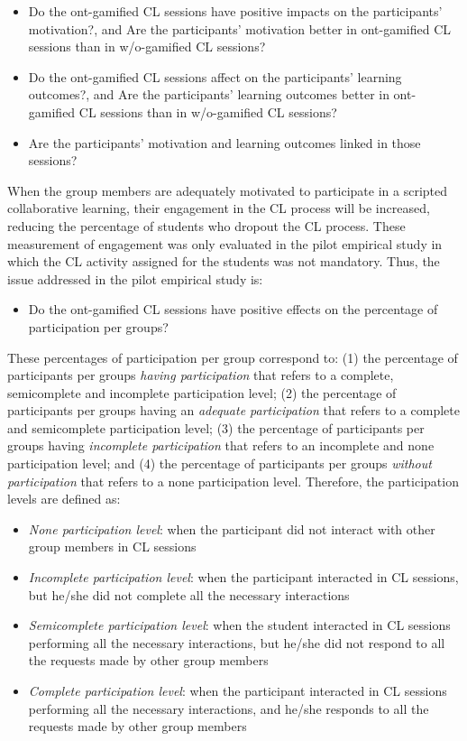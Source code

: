 \begin{itemize}
\item Do the ont-gamified CL sessions have positive impacts on the participants' motivation?, and
Are the participants' motivation better in ont-gamified CL sessions than in w/o-gamified CL sessions?
\item Do the ont-gamified CL sessions affect on the participants' learning outcomes?, and
Are the participants' learning outcomes better in ont-gamified CL sessions than in w/o-gamified CL sessions?
\item Are the participants' motivation and learning outcomes linked in those sessions?
\end{itemize}

When the group members are adequately motivated to participate in a scripted collaborative learning, their engagement in the CL process will be increased, reducing the percentage of students who dropout the CL process.
These measurement of engagement was only evaluated in the pilot empirical study in which the CL activity assigned for the students was not mandatory. 
Thus, the issue addressed in the pilot empirical study is:

\begin{itemize}
\item Do the ont-gamified CL sessions have positive effects on the percentage of participation per groups?
\end{itemize}

These percentages of participation per group correspond to:
(1) the percentage of participants per groups \emph{having participation} that refers to a complete, semicomplete and incomplete participation level;
(2) the percentage of participants per groups having an \emph{adequate participation} that refers to a complete and semicomplete participation level;
(3) the percentage of participants per groups having \emph{incomplete participation} that refers to an incomplete and none participation level; and
(4) the percentage of participants per groups \emph{without participation} that refers to a none participation level.
Therefore, the participation levels are defined as:

\begin{itemize}
\item \emph{None participation level}: when the participant did not interact with other group members in CL sessions
\item \emph{Incomplete participation level}: when the participant interacted in CL sessions, but he/she did not complete all the necessary interactions
\item \emph{Semicomplete participation level}: when the student interacted in CL sessions performing all the necessary interactions, but he/she did not respond to all the requests made by other group members
\item \emph{Complete participation level}: when the participant interacted in CL sessions performing all the necessary interactions, and he/she responds to all the requests made by other group members
\end{itemize}
 
